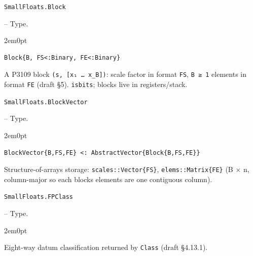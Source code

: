 \par\medskip\noindent\begin{minipage}{\linewidth}
\hypertarget{16226061866935425277}{\texttt{SmallFloats.Block}}  -- {Type.}
\nopagebreak
\begin{adjustwidth}{2em}{0pt}


\begin{verbatim}
Block{B, FS<:Binary, FE<:Binary}
\end{verbatim}

A P3109 block \texttt{(s, [x₁ … x\_\allowbreak{}B])}: scale factor in format \texttt{FS}, \texttt{B ≥ 1} elements in format \texttt{FE} (draft §5). \texttt{isbits}; blocks live in registers/stack.



\end{adjustwidth}
\end{minipage}
\par\medskip

\par\medskip\noindent\begin{minipage}{\linewidth}
\hypertarget{2816898984109632562}{\texttt{SmallFloats.BlockVector}}  -- {Type.}
\nopagebreak
\begin{adjustwidth}{2em}{0pt}


\begin{verbatim}
BlockVector{B,FS,FE} <: AbstractVector{Block{B,FS,FE}}
\end{verbatim}

Structure-of-arrays storage: \texttt{scales::Vector\{FS\}}, \texttt{elems::Matrix\{FE\}} (B × n, column-major so each block{\textquotesingle}s elements are one contiguous column).



\end{adjustwidth}
\end{minipage}
\par\medskip

\par\medskip\noindent\begin{minipage}{\linewidth}
\hypertarget{5292295670398946918}{\texttt{SmallFloats.FPClass}}  -- {Type.}
\nopagebreak
\begin{adjustwidth}{2em}{0pt}

Eight-way datum classification returned by \texttt{Class} (draft §4.13.1).



\end{adjustwidth}
\end{minipage}
\par\medskip


